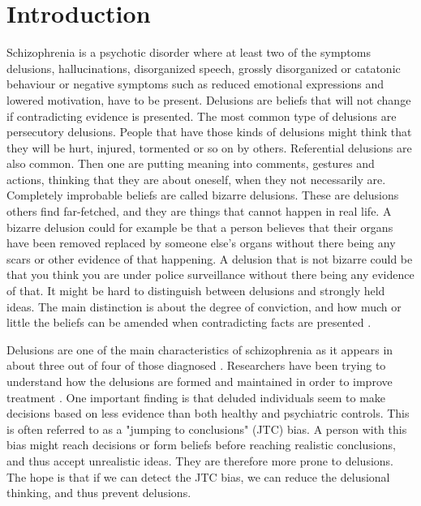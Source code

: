 \newpage
\chapter{Introduction}
Schizophrenia is a psychotic disorder where at least two of the symptoms delusions, hallucinations, disorganized speech, grossly disorganized or catatonic behaviour or negative symptoms such as reduced emotional expressions and lowered motivation, have to be present. 
Delusions are beliefs that will not change if contradicting evidence is presented. The most common type of delusions are persecutory delusions. People that have those kinds of delusions might think that they will be hurt, injured, tormented or so on by others. Referential delusions are also common. Then one are putting meaning into comments, gestures and actions, thinking that they are about oneself, when they not necessarily are. Completely improbable beliefs are called bizarre delusions. These are delusions others find far-fetched, and they are things that cannot happen in real life. A bizarre delusion could for example be that a person believes that their organs have been removed replaced by someone else's organs without there being any scars or other evidence of that happening. A delusion that is not bizarre could be that you think you are under police surveillance without there being any evidence of that. It might be hard to distinguish between delusions and strongly held ideas. The main distinction is about the degree of conviction, and how much or little the beliefs can be amended when contradicting facts are presented \citep{dsm-5}. 


Delusions are one of the main characteristics of schizophrenia as it appears in about three out of four of those diagnosed \citep{garety2011}. Researchers have been trying to understand how the delusions are formed and maintained in order to improve treatment \citep{dudley_meta_2016}. One important finding is that deluded individuals seem to make decisions based on less evidence than both healthy and psychiatric controls. This is often referred to as a "jumping to conclusions" (JTC) bias. A person with this bias might reach decisions or form beliefs before reaching realistic conclusions, and thus accept unrealistic ideas. They are therefore more prone to delusions. The hope is that if we can detect the JTC bias, we can reduce the delusional thinking, and thus prevent delusions.

